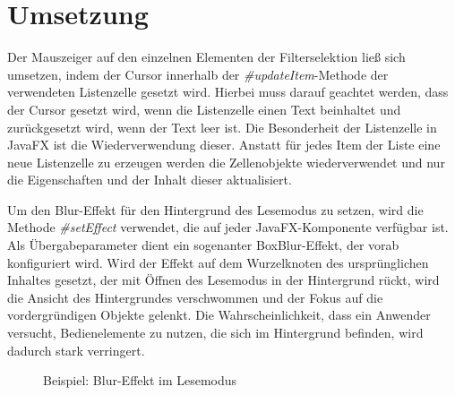 \section{Umsetzung} \label{sec:optiImplementation}
Der Mauszeiger auf den einzelnen Elementen der Filterselektion ließ sich umsetzen, indem der Cursor innerhalb der \textit{\#{}updateItem}-Methode der verwendeten Listenzelle gesetzt wird. Hierbei muss darauf geachtet werden, dass der Cursor gesetzt wird, wenn die Listenzelle einen Text beinhaltet und zurückgesetzt wird, wenn der Text leer ist. Die Besonderheit der Listenzelle in JavaFX ist die Wiederverwendung dieser. Anstatt für jedes Item der Liste eine neue Listenzelle zu erzeugen werden die Zellenobjekte wiederverwendet und nur die Eigenschaften und der Inhalt dieser aktualisiert.\par
{}
Um den Blur-Effekt für den Hintergrund des Lesemodus zu setzen, wird die Methode \textit{\#{}setEffect} verwendet, die auf jeder JavaFX-Komponente verfügbar ist. Als Übergabeparameter dient ein sogenanter BoxBlur-Effekt, der vorab konfiguriert wird. Wird der Effekt auf dem Wurzelknoten des ursprünglichen Inhaltes gesetzt, der mit Öffnen des Lesemodus in der Hintergrund rückt, wird die Ansicht des Hintergrundes verschwommen und der Fokus auf die vordergründigen Objekte gelenkt. Die Wahrscheinlichkeit, dass ein Anwender versucht, Bedienelemente zu nutzen, die sich im Hintergrund befinden, wird dadurch stark verringert.\par
\begin{figure}[H] 
	\centering
	\hspace{1.0em}
	\caption{Beispiel: Blur-Effekt im Lesemodus}
	\label{fig:blurGallery}
\end{figure}
